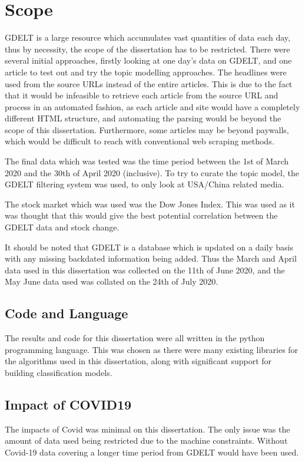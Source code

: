 \section{Scope}
\label{scope}
GDELT is a large resource which accumulates vast quantities of data each day, thus by necessity, the scope of the dissertation has to be restricted. There were several initial approaches, firstly looking at one day's data on GDELT, and one article to test out and try the topic modelling approaches. The headlines were used from the source URLs instead of the entire articles. This is due to the fact that it would be infeasible to retrieve each article from the source URL and process in an automated fashion, as each article and site would have a completely different HTML structure, and automating the parsing would be beyond the scope of this dissertation. Furthermore, some articles may be beyond paywalls, which would be difficult to reach with conventional web scraping methods.

The final data which was tested was the time period between the 1st of March 2020 and the 30th of April 2020 (inclusive). To try to curate the topic model, the GDELT filtering system was used, to only look at USA/China related media. 

The stock market which was used was the Dow Jones Index. This was used as it was thought that this would give the best potential correlation between the GDELT data and stock change. 

It should be noted that GDELT is a database which is updated on a daily basis with any missing backdated information being added. Thus the March and April data used in this dissertation was collected on the 11th of June 2020, and the May June data used was collated on the 24th of July 2020. 

\subsection{Code and Language}
The results and code for this dissertation were all written in the python programming language. This was chosen as there were many existing libraries for the algorithms used in this dissertation, along with significant support for building classification models.

\subsection{Impact of COVID19}
The impacts of Covid was minimal on this dissertation. The only issue was the amount of data used being restricted due to the machine constraints. Without Covid-19 data covering a longer time period from GDELT would have been used.